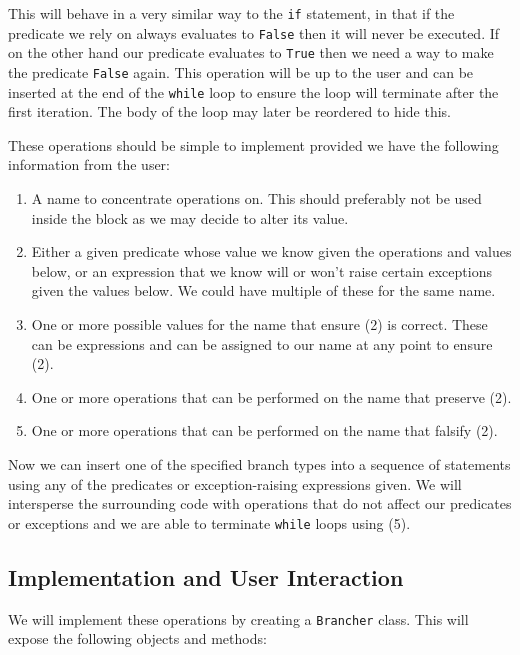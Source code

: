 \documentclass[twoside,a4paper]{report}
\begin{document}
This will behave in a very similar way to the \texttt{if} statement, in that if the predicate we rely on always evaluates to \texttt{False} then it will never
be executed. If on the other hand our predicate evaluates to \texttt{True} then we need a way to make the predicate \texttt{False} again. This operation will
be up to the user and can be inserted at the end of the \texttt{while} loop to ensure the loop will terminate after the first iteration. The body of the loop
may later be reordered to hide this.

These operations should be simple to implement provided we have the following information from the user:

\begin{enumerate}
\item A name to concentrate operations on. This should preferably not be used inside the block as we may decide to alter its value.
\item Either a given predicate whose value we know given the operations and values below, or an expression that we know will or won't raise certain exceptions
      given the values below. We could have multiple of these for the same name.
\item One or more possible values for the name that ensure (2) is correct. These can be expressions and can be assigned to our name at any point to
      ensure (2).
\item One or more operations that can be performed on the name that preserve (2).
\item One or more operations that can be performed on the name that falsify (2).
\end{enumerate}

Now we can insert one of the specified branch types into a sequence of statements using any of the predicates or exception-raising expressions given. We will
intersperse the surrounding code with operations that do not affect our predicates or exceptions and we are able to terminate \texttt{while} loops using (5).

\subsection{Implementation and User Interaction}

We will implement these operations by creating a \texttt{Brancher} class. This will expose the following objects and methods:
\end{document}
